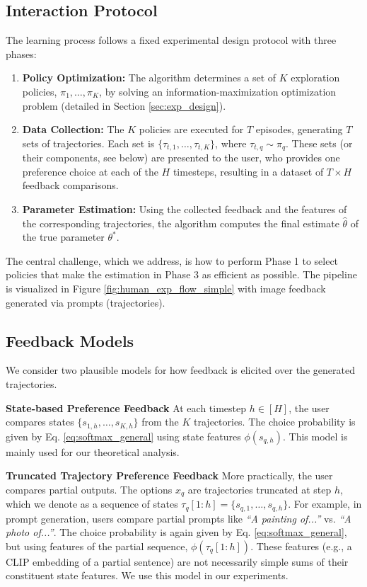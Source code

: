 \documentclass{article}
\begin{document}
\vspace{-0.2cm} \subsection{Interaction Protocol}
The learning process follows a fixed experimental design protocol with three phases:
\begin{enumerate}
    \item \textbf{Policy Optimization:} The algorithm determines a set of $K$ exploration policies, $\pi_1, \dots, \pi_K$, by solving an information-maximization optimization problem (detailed in Section \ref{sec:exp_design}).
    \item \textbf{Data Collection:} The $K$ policies are executed for $T$ episodes, generating $T$ sets of trajectories. Each set is $\{\tau_{t,1}, \dots, \tau_{t,K}\}$, where $\tau_{t,q} \sim \pi_q$. These sets (or their components, see below) are presented to the user, who provides one preference choice at each of the $H$ timesteps, resulting in a dataset of $T \times H$ feedback comparisons.
    \item \textbf{Parameter Estimation:} Using the collected feedback and the features of the corresponding trajectories, the algorithm computes the final estimate $\hat{\theta}$ of the true parameter $\theta^*$.
\end{enumerate}
The central challenge, which we address, is how to perform Phase 1 to select policies that make the estimation in Phase 3 as efficient as possible. The pipeline is visualized in Figure \ref{fig:human_exp_flow_simple} with image feedback generated via prompts (trajectories).

\vspace{-0.2cm}\subsection{Feedback Models}
\label{sec:feedback_models}
\vspace{-0.2cm} We consider two plausible models for how feedback is elicited over the generated trajectories.

\textbf{State-based Preference Feedback} 
At each timestep $h \in [H]$, the user compares states $\{s_{1,h}, \dots, s_{K,h}\}$ from the $K$ trajectories. The choice probability is given by Eq. \ref{eq:softmax_general} using state features $\phi(s_{q,h})$. This model is mainly used for our theoretical analysis.

\textbf{Truncated Trajectory Preference Feedback}  
More practically, the user compares partial outputs. The options $x_q$ are trajectories truncated at step $h$, which we denote as a sequence of states $\tau_q[1:h] = \{s_{q,1}, \dots, s_{q,h}\}$. For example, in prompt generation, users compare partial prompts like \textit{``A painting of...''} vs. \textit{``A photo of...''}. The choice probability is again given by Eq. \ref{eq:softmax_general}, but using features of the partial sequence, $\phi(\tau_q[1:h])$. These features (e.g., a CLIP embedding of a partial sentence) are not necessarily simple sums of their constituent state features. We use this model in our experiments.
\end{document}
